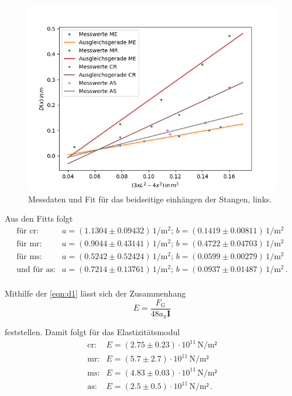 \begin{figure}[H]
	\centering
	\includegraphics{Daten/AS2_l.png}
	\caption{Messdaten und Fit für das beidseitige einhängen der Stangen, links.}
	\label{fig:links}
\end{figure}

\noindent
Aus den Fitts folgt
\begin{align*}
    \text{für cr}:& a = (1.1304 \pm 0.09432) \, \si{1\per\meter^2} ; \, b = (0.1419 \pm 0.00811) \, \si{1\per\meter^2}  \\
    \text{für mr}:& a = (0.9044 \pm 0.43141) \, \si{1\per\meter^2} ; \, b = (0.4722 \pm 0.04703) \, \si{1\per\meter^2} \\
    \text{für ms}:& a = (0.5242 \pm 0.52424) \, \si{1\per\meter^2} ; \, b = (0.0599 \pm 0.00279) \, \si{1\per\meter^2}\\
\text{und für as}:& a = (0.7214 \pm 0.13761) \, \si{1\per\meter^2} ;\,  b = (0.0937 \pm 0.01487) \, \si{1\per\meter^2} \, .\\
\end{align*} 

\noindent
Mithilfe der \autoref{eqn:d1} lässt sich der Zusammenhang 
\begin{equation*}
    E = \frac{F_\text{G}}{48a_\text{x}\symbf{I}}
\end{equation*}

\noindent
feststellen. Damit folgt für das Elastizitätsmodul
\begin{align*}
    \text{cr}:& E = (2.75 \pm 0.23) \cdot 10^{11}   \, \si{\newton\per\meter²}\\
    \text{mr}:& E = (5.7 \pm 2.7) \cdot 10^{11} \, \si{\newton\per\meter²}\\
    \text{ms}:& E = (4.83 \pm 0.03) \cdot 10^{11} \, \si{\newton\per\meter²} \\
    \text{as}:& E = (2.5\pm 0.5) \cdot 10^{11} \, \si{\newton\per\meter²} \, .\\
\end{align*} 

